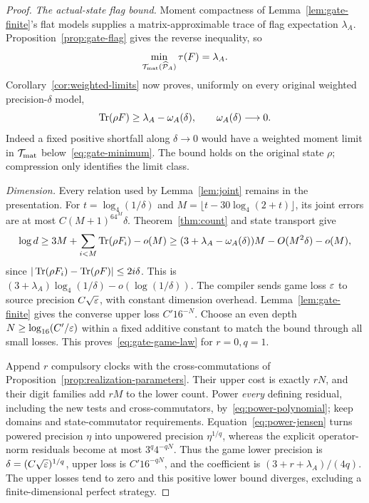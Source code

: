 \begin{proof}
\emph{The actual-state flag bound.} Moment compactness of Lemma~\ref{lem:gate-finite}'s flat models supplies a matrix-approximable trace of flag expectation $\lambda_A$. Proposition~\ref{prop:gate-flag} gives the reverse inequality, so
\begin{equation}\label{eq:gate-minimum}
 \min_{\mathcal T_{\rm mat}(\widehat{\mathcal P}_A)}\tau(F)=\lambda_A.
\end{equation}
Corollary~\ref{cor:weighted-limits} now proves, uniformly on every original weighted precision-$\delta$ model,
\begin{equation}\label{eq:gate-weighted}
 \operatorname{Tr}(\rho F)\ge\lambda_A-\omega_A(\delta),\qquad \omega_A(\delta)\longrightarrow0.
\end{equation}
Indeed a fixed positive shortfall along $\delta\to0$ would have a weighted moment limit in $\mathcal T_{\rm mat}$ below~\eqref{eq:gate-minimum}. The bound holds on the original state $\rho$; compression only identifies the limit class.

\emph{Dimension.} Every relation used by Lemma~\ref{lem:joint} remains in the presentation. For $t=\log_4(1/\delta)$ and $M=\lfloor t-30\log_4(2+t)\rfloor$, its joint errors are at most $C(M+1)^64^M\delta$. Theorem~\ref{thm:count} and state transport give
\[
 \log d\ge3M+\sum_{i<M}\operatorname{Tr}(\rho F_i)-o(M)
 \ge(3+\lambda_A-\omega_A(\delta))M-O(M^2\delta)-o(M),
\]
since $|\operatorname{Tr}(\rho F_i)-\operatorname{Tr}(\rho F)|\le2i\delta$. This is $(3+\lambda_A)\log_4(1/\delta)-o(\log(1/\delta))$. The compiler sends game loss $\varepsilon$ to source precision $C\sqrt{\varepsilon}$, with constant dimension overhead. Lemma~\ref{lem:gate-finite} gives the converse upper loss $C'16^{-N}$. Choose an even depth $N\ge\log_{16}(C'/\varepsilon)$ within a fixed additive constant to match the bound through all small losses. This proves~\eqref{eq:gate-game-law} for $r=0,q=1$.

Append $r$ compulsory clocks with the cross-commutations of Proposition~\ref{prop:realization-parameters}. Their upper cost is exactly $rN$, and their digit families add $rM$ to the lower count. Power \emph{every} defining residual, including the new tests and cross-commutators, by~\eqref{eq:power-polynomial}; keep domains and state-commutator requirements. Equation~\eqref{eq:power-jensen} turns powered precision $\eta$ into unpowered precision $\eta^{1/q}$, whereas the explicit operator-norm residuals become at most $3^q4^{-qN}$. Thus the game lower precision is $\delta=(C\sqrt{\varepsilon})^{1/q}$, upper loss is $C'16^{-qN}$, and the coefficient is $(3+r+\lambda_A)/(4q)$. The upper losses tend to zero and this positive lower bound diverges, excluding a finite-dimensional perfect strategy.


\end{proof}
